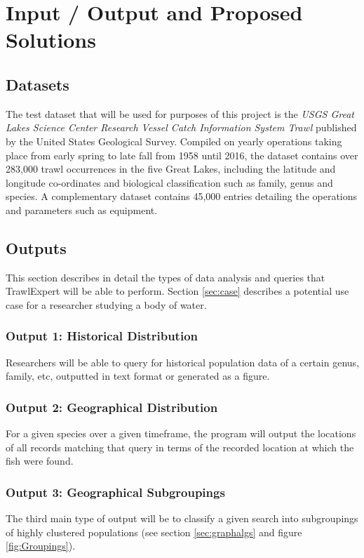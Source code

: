 \documentclass{article}
\begin{document}
\section{Input / Output and Proposed Solutions}
\subsection{Datasets}\label{sec:out}
The test dataset that will be used for purposes of this project is the \textit{USGS Great Lakes Science Center Research Vessel Catch Information System Trawl} published by the United States Geological Survey. Compiled on yearly operations taking place from early spring to late fall from 1958 until 2016, the dataset contains over 283,000 trawl occurrences in the five Great Lakes, including the latitude and longitude co-ordinates and biological classification such as family, genus and species. A complementary dataset contains 45,000 entries detailing the operations and parameters such as equipment.

\subsection{Outputs}

This section describes in detail the types of data analysis and queries that TrawlExpert will be able to perform. Section \ref{sec:case} describes a potential use case for a researcher studying a body of water.

\subsubsection{Output 1: Historical Distribution}
Researchers will be able to query for historical population data of a certain genus, family, etc, outputted in text format or generated as a figure.

\subsubsection{Output 2: Geographical Distribution}
For a given species over a given timeframe, the program will output the locations of all records matching that query in terms of the recorded location at which the fish were found.

\subsubsection{Output 3: Geographical Subgroupings}\label{sec:subgroup}
The third main type of output will be to classify a given search into subgroupings of highly clustered populations (see section \ref{sec:graphalgs} and figure \ref{fig:Groupings}).
\end{document}
